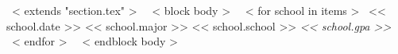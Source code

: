 ~< extends "section.tex" >~
~< block body >~
  ~< for school in items >~
    \cventry
      {<< school.date >>}
      {<< school.major >>}
      {<< school.school >>}
      {}
      {\textit{<< school.gpa >>}}
      {}
  ~< endfor >~
~< endblock body >~
